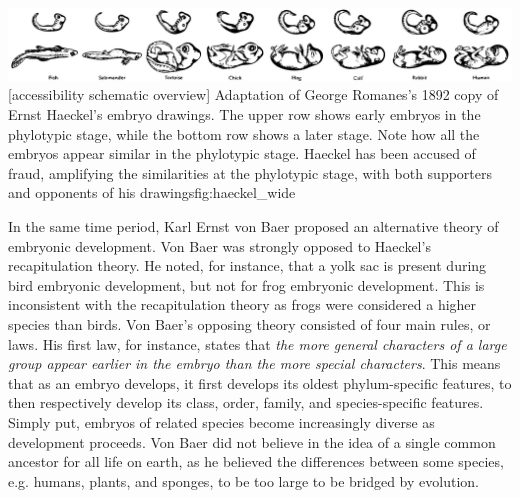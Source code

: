 {\includegraphics[width=2.2\textwidth]
{ch.introduction/imgs/haeckel_wide.png}}
[accessibility schematic overview]
{Adaptation of George Romanes's 1892 copy of Ernst Haeckel's embryo drawings. The upper row shows early embryos in the phylotypic stage, while the bottom row shows a later stage. Note how all the embryos appear similar in the phylotypic stage. Haeckel has been accused of fraud, amplifying the similarities at the phylotypic stage, with both supporters\cite{Richards2008} and opponents of his drawings\cite{Pennisi1997}}{fig:haeckel_wide}

In the same time period, Karl Ernst von Baer proposed an alternative theory of embryonic development. Von Baer was strongly opposed to Haeckel's recapitulation theory. He noted, for instance, that a yolk sac is present during bird embryonic development, but not for frog embryonic development. This is inconsistent with the recapitulation theory as frogs were considered a higher species than birds. Von Baer's opposing theory consisted of four main rules, or laws\cite{baer1828}. His first law, for instance, states that \textit{the more general characters of a large group appear earlier in the embryo than the more special characters}. This means that as an embryo develops, it first develops its oldest phylum-specific features, to then respectively develop its class, order, family, and species-specific features. Simply put, embryos of related species become increasingly diverse as development proceeds. Von Baer did not believe in the idea of a single common ancestor for all life on earth, as he believed the differences between some species, e.g. humans, plants, and sponges, to be too large to be bridged by evolution.

